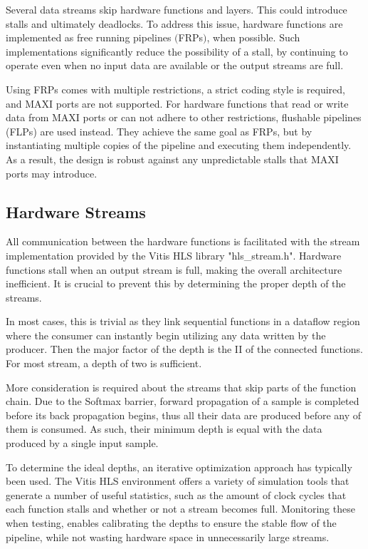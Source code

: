 Several data streams skip hardware functions and layers. This could introduce stalls and ultimately deadlocks. To address this issue, hardware functions are implemented as free running pipelines $($FRPs$)$, when possible. Such implementations significantly reduce the possibility of a stall, by continuing to operate even when no input data are available or the output streams are full. %

Using FRPs comes with multiple restrictions, a strict coding style is required, and MAXI ports are not supported. For hardware functions that read or write data from MAXI ports or can not adhere to other restrictions, flushable pipelines (FLPs) are used instead. They achieve the same goal as FRPs, but by instantiating multiple copies of the pipeline and executing them independently. As a result, the design is robust against any unpredictable stalls that MAXI ports may introduce. %

\subsection{Hardware Streams}
All communication between the hardware functions is facilitated with the stream implementation provided by the Vitis HLS library "hls\_stream.h". Hardware functions stall when an output stream is full, making the overall architecture inefficient. It is crucial to prevent this by determining the proper depth of the streams.

In most cases, this is trivial as they link sequential functions in a dataflow region where the consumer can instantly begin utilizing any data written by the producer. Then the major factor of the depth is the II of the connected functions. For most stream, a depth of two is sufficient.

More consideration is required about the streams that skip parts of the function chain. Due to the Softmax barrier, forward propagation of a sample is completed before its back propagation begins, thus all their data are produced before any of them is consumed. As such, their minimum depth is equal with the data produced by a single input sample.

To determine the ideal depths, an iterative optimization approach has typically been used. The Vitis HLS environment offers a variety of simulation tools that generate a number of useful statistics, such as the amount of clock cycles that each function stalls and whether or not a stream becomes full. Monitoring these when testing, enables calibrating the depths to ensure the stable flow of the pipeline, while not wasting hardware space in unnecessarily large streams.

